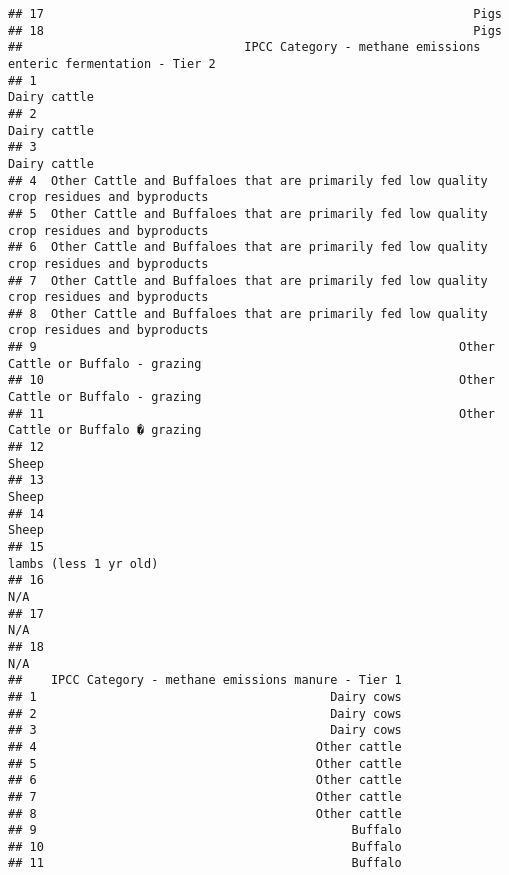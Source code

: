 \documentclass[
]{article}
\begin{document}
\begin{verbatim}
## 17                                                            Pigs
## 18                                                            Pigs
##                               IPCC Category - methane emissions enteric fermentation - Tier 2
## 1                                                                                Dairy cattle
## 2                                                                                Dairy cattle
## 3                                                                                Dairy cattle
## 4  Other Cattle and Buffaloes that are primarily fed low quality crop residues and byproducts
## 5  Other Cattle and Buffaloes that are primarily fed low quality crop residues and byproducts
## 6  Other Cattle and Buffaloes that are primarily fed low quality crop residues and byproducts
## 7  Other Cattle and Buffaloes that are primarily fed low quality crop residues and byproducts
## 8  Other Cattle and Buffaloes that are primarily fed low quality crop residues and byproducts
## 9                                                           Other Cattle or Buffalo - grazing
## 10                                                          Other Cattle or Buffalo - grazing
## 11                                                          Other Cattle or Buffalo � grazing
## 12                                                                                      Sheep
## 13                                                                                      Sheep
## 14                                                                                      Sheep
## 15                                                                      lambs (less 1 yr old)
## 16                                                                                        N/A
## 17                                                                                        N/A
## 18                                                                                        N/A
##    IPCC Category - methane emissions manure - Tier 1
## 1                                         Dairy cows
## 2                                         Dairy cows
## 3                                         Dairy cows
## 4                                       Other cattle
## 5                                       Other cattle
## 6                                       Other cattle
## 7                                       Other cattle
## 8                                       Other cattle
## 9                                            Buffalo
## 10                                           Buffalo
## 11                                           Buffalo

\end{verbatim}
\end{document}
